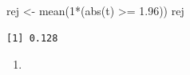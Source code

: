 \documentclass[
  letterpaper,
  DIV=11,
  numbers=noendperiod]{scrreprt}
\newenvironment{Shaded}{\begin{snugshade}}{\end{snugshade}}
\newcommand{\DecValTok}[1]{\textcolor[rgb]{0.68,0.00,0.00}{#1}}
\newcommand{\FloatTok}[1]{\textcolor[rgb]{0.68,0.00,0.00}{#1}}
\newcommand{\FunctionTok}[1]{\textcolor[rgb]{0.28,0.35,0.67}{#1}}
\newcommand{\NormalTok}[1]{\textcolor[rgb]{0.00,0.23,0.31}{#1}}
\newcommand{\OtherTok}[1]{\textcolor[rgb]{0.00,0.23,0.31}{#1}}
\newcommand{\SpecialCharTok}[1]{\textcolor[rgb]{0.37,0.37,0.37}{#1}}
\providecommand{\tightlist}{%
  \setlength{\itemsep}{0pt}\setlength{\parskip}{0pt}}\usepackage{longtable,booktabs,array}
\begin{document}
\begin{Shaded}
\begin{Highlighting}[]
\NormalTok{rej }\OtherTok{\textless{}{-}} \FunctionTok{mean}\NormalTok{(}\DecValTok{1}\SpecialCharTok{*}\NormalTok{(}\FunctionTok{abs}\NormalTok{(t) }\SpecialCharTok{\textgreater{}=} \FloatTok{1.96}\NormalTok{))}
\NormalTok{rej}
\end{Highlighting}
\end{Shaded}

\begin{verbatim}
[1] 0.128
\end{verbatim}

\begin{enumerate}
\def\labelenumi{\arabic{enumi}.}
\setcounter{enumi}{3}
\tightlist
\item
\end{enumerate}
\end{document}
